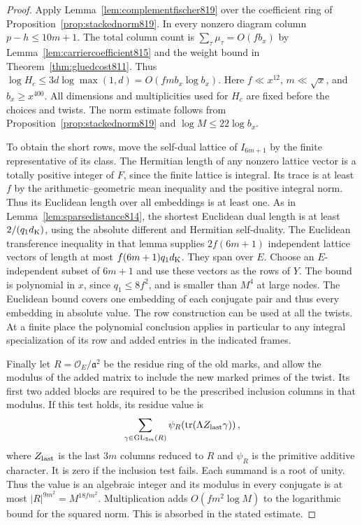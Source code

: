 \documentclass[a4paper,11pt]{article}
\theoremstyle{definition}
\theoremstyle{remark}
\numberwithin{equation}{section}
\begin{document}
\begin{proof}
Apply Lemma~\ref{lem:complementfischer819} over the
coefficient ring of Proposition~\ref{prop:stackednorm819}.
In every nonzero diagram column \(p-h\le10m+1\).
The total column count is \(\sum_\tau\mu_\tau=O(fb_x)\)
by Lemma~\ref{lem:carriercoefficient815} and the weight
bound in Theorem~\ref{thm:gluedcost811}. Thus
\(\log H_c\le3d\log\max(1,d)=O(fmb_x\log b_x)\).
Here \(f\ll x^{12}\), \(m\ll\sqrt x\), and \(b_x\ge x^{400}\).
All dimensions and multiplicities used for \(H_c\) are
fixed before the choices and twists. The norm estimate
follows from Proposition~\ref{prop:stackednorm819} and
\(\log M\le22\log b_x\).

To obtain the short rows, move the self-dual lattice of
\(I_{6m+1}\) by the finite representative of its class.
The Hermitian length of any nonzero lattice vector is
a totally positive integer of \(F\), since the finite
lattice is integral. Its trace is at least \(f\) by the
arithmetic--geometric mean inequality and the positive
integral norm. Thus its Euclidean length over all
embeddings is at least one. As in
Lemma~\ref{lem:sparsedistance814}, the shortest Euclidean
dual length is at least \(2/(q_1d_{\rm K})\), using the
absolute different and Hermitian self-duality. The
Euclidean transference inequality in that lemma supplies
\(2f(6m+1)\) independent lattice vectors of length at
most \(f(6m+1)q_1d_{\rm K}\). They span over \(E\).
Choose an \(E\)-independent subset of \(6m+1\) and use
these vectors as the rows of \(Y\). The bound is polynomial
in \(x\), since \(q_1\le8 f^2\), and is smaller than
\(M^4\) at large nodes. The Euclidean bound covers one
embedding of each conjugate pair and thus every embedding
in absolute value. The row construction can be used at
all the twists. At a finite place the polynomial conclusion
applies in particular to any integral specialization of
its row and added entries in the indicated frames.

Finally let \(R=\mathcal O_E/\mathfrak a^2\) be the residue
ring of the old marks, and allow the modulus of the added
matrix to include the new marked primes of the twist.
Its first two added blocks are required to be the
prescribed inclusion columns in that modulus. If this
test holds, its residue value is
\[
      \sum_{\gamma\in\operatorname{GL}_{3m}(R)}
          \psi_R\!\left(\operatorname{tr}(\Lambda Z_{\rm last}\gamma)\right),
\]
where \(Z_{\rm last}\) is the last \(3m\) columns reduced
to \(R\) and \(\psi_R\) is the primitive additive character.
It is zero if the inclusion test fails. Each summand is a
root of unity. Thus the value is an algebraic integer and
its modulus in every conjugate is at most
\(|R|^{9m^2}=M^{18fm^2}\). Multiplication adds
\(O(fm^2\log M)\) to the logarithmic bound for the squared
norm. This is absorbed in the stated estimate.
\end{proof}
\end{document}

